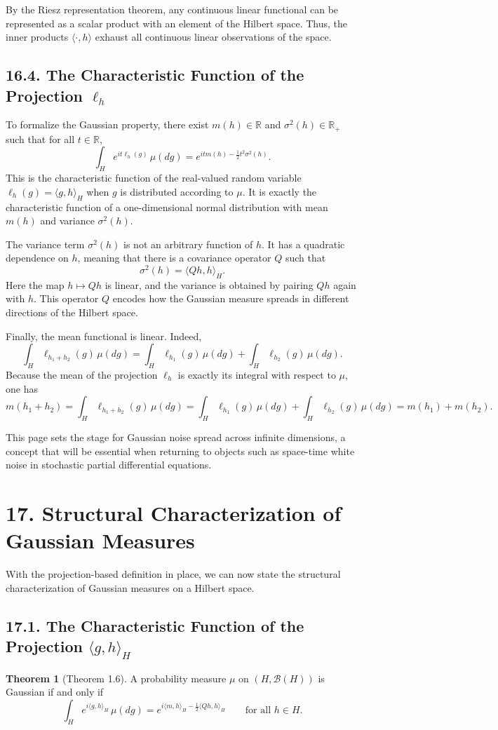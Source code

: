 \documentclass[11pt]{article}
\theoremstyle{definition}
\newtheorem{theorem}{Theorem}
\theoremstyle{remark}
\begin{document}
By the Riesz representation theorem, any continuous linear functional can be represented as a scalar product with an element of the Hilbert space. Thus, the inner products $\langle \cdot,h\rangle$ exhaust all continuous linear observations of the space.

\subsection*{16.4. The Characteristic Function of the Projection $\ell_h$}
To formalize the Gaussian property, there exist $m(h)\in\mathbb R$ and $\sigma^2(h)\in\mathbb R_+$ such that for all $t\in\mathbb R$,
\[
\int_H e^{it\ell_h(g)}\,\mu(dg)=e^{itm(h)-\frac12 t^2\sigma^2(h)}.
\]
This is the characteristic function of the real-valued random variable $\ell_h(g)=\langle g,h\rangle_H$ when $g$ is distributed according to $\mu$. It is exactly the characteristic function of a one-dimensional normal distribution with mean $m(h)$ and variance $\sigma^2(h)$.

The variance term $\sigma^2(h)$ is not an arbitrary function of $h$. It has a quadratic dependence on $h$, meaning that there is a covariance operator $Q$ such that
\[
\sigma^2(h)=\langle Qh,h\rangle_H.
\]
Here the map $h\mapsto Qh$ is linear, and the variance is obtained by pairing $Qh$ again with $h$. This operator $Q$ encodes how the Gaussian measure spreads in different directions of the Hilbert space.

Finally, the mean functional is linear. Indeed,
\[
\int_H \ell_{h_1+h_2}(g)\,\mu(dg)=\int_H \ell_{h_1}(g)\,\mu(dg)+\int_H \ell_{h_2}(g)\,\mu(dg).
\]
Because the mean of the projection $\ell_h$ is exactly its integral with respect to $\mu$, one has
\[
m(h_1+h_2)
=
\int_H \ell_{h_1+h_2}(g)\,\mu(dg)
=
\int_H \ell_{h_1}(g)\,\mu(dg)+\int_H \ell_{h_2}(g)\,\mu(dg)
=
m(h_1)+m(h_2).
\]

This page sets the stage for Gaussian noise spread across infinite dimensions, a concept that will be essential when returning to objects such as space-time white noise in stochastic partial differential equations.

\section*{17. Structural Characterization of Gaussian Measures}
With the projection-based definition in place, we can now state the structural characterization of Gaussian measures on a Hilbert space.

\subsection*{17.1. The Characteristic Function of the Projection $\langle g,h\rangle_H$}
\begin{theorem}[Theorem 1.6]
A probability measure $\mu$ on $(H,\mathcal B(H))$ is Gaussian if and only if
\[
\int_H e^{i\langle g,h\rangle_H}\,\mu(dg)=e^{i\langle m,h\rangle_H-\frac12 \langle Qh,h\rangle_H}
\qquad \text{for all } h\in H.
\]
\end{theorem}
\end{document}
